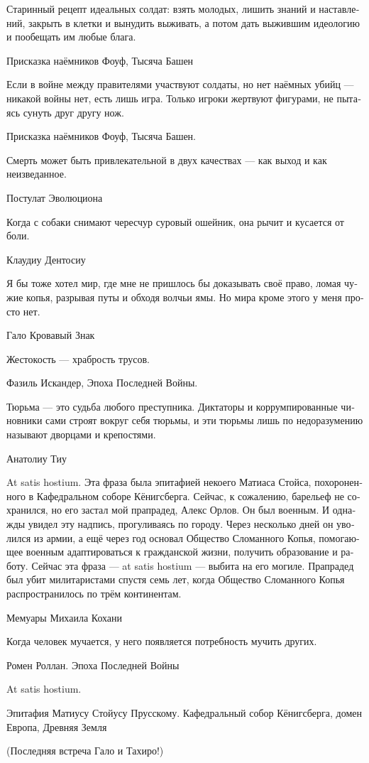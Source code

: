 \documentclass[a4paper,12pt,fleqn]{book}\usepackage{cooltooltips}\usepackage{polyglossia}\setdefaultlanguage[babelshorthands=true]{russian}\setotherlanguage{english}\defaultfontfeatures{Ligatures=TeX,Mapping=tex-text} \usepackage{xcolor}\definecolor{lightgray}{HTML}{bbbbbb}\color{lightgray}\newcommand{\ml}[3]{\textenglish{\textcolor{black}{#3}}}
\newcommand{\FM}{\footnotemark}
\newcommand{\FA}[1]{\footnotetext{#1 \emph{\ml{$0$}{---~Прим.~авт.}{---~Author.}}}}
\begin{document}
{\epigraph
{Старинный рецепт идеальных солдат: взять молодых, лишить знаний и наставлений, закрыть в клетки и вынудить выживать, а потом дать выжившим идеологию и пообещать им любые блага.}
{Присказка наёмников Фоуф, Тысяча Башен}

\epigraph
{Если в войне между правителями участвуют солдаты, но нет наёмных убийц --- никакой войны нет, есть лишь игра.
Только игроки жертвуют фигурами, не пытаясь сунуть друг другу нож.}
{Присказка наёмников Фоуф, Тысяча Башен.}

\epigraph
{Смерть может быть привлекательной в двух качествах --- как выход и как неизведанное.}
{Постулат Эволюциона}

\epigraph
{Когда с собаки снимают чересчур суровый ошейник, она рычит и кусается от боли.}
{Клаудиу Дентосиу}

\epigraph
{Я бы тоже хотел мир, где мне не пришлось бы доказывать своё право, ломая чужие копья, разрывая путы и обходя волчьи ямы.
Но мира кроме этого у меня просто нет.}
{Гало Кровавый Знак}

\epigraph
{Жестокость --- храбрость трусов.}
{Фазиль Искандер, Эпоха Последней Войны.}

\epigraph
{Тюрьма --- это судьба любого преступника.
Диктаторы и коррумпированные чиновники сами строят вокруг себя тюрьмы, и эти тюрьмы лишь по недоразумению называют дворцами и крепостями.}
{Анатолиу Тиу}

\epigraph
{At satis hostium.
Эта фраза была эпитафией некоего Матиаса Стойса, похороненного в Кафедральном соборе Кёнигсберга.
Сейчас, к сожалению, барельеф не сохранился, но его застал мой прапрадед, Алекс Орлов.
Он был военным.
И однажды увидел эту надпись, прогуливаясь по городу.
Через несколько дней он уволился из армии, а ещё через год основал Общество Сломанного Копья, помогающее военным адаптироваться к гражданской жизни, получить образование и работу.
Сейчас эта фраза --- at satis hostium --- выбита на его могиле.
Прапрадед был убит милитаристами спустя семь лет, когда Общество Сломанного Копья распространилось по трём континентам.}
{Мемуары Михаила Кохани}

\epigraph
{Когда человек мучается, у него появляется потребность мучить других.}
{Ромен Роллан.
Эпоха Последней Войны}

\epigraph
{At satis hostium\FM.}
{Эпитафия Матиусу Стойусу Прусскому.
Кафедральный собор Кёнигсберга, домен Европа, Древняя Земля}
\FA{
Но хватит врагов (эллатинский).
}

(Последняя встреча Гало и Тахиро!)

}
\end{document}
